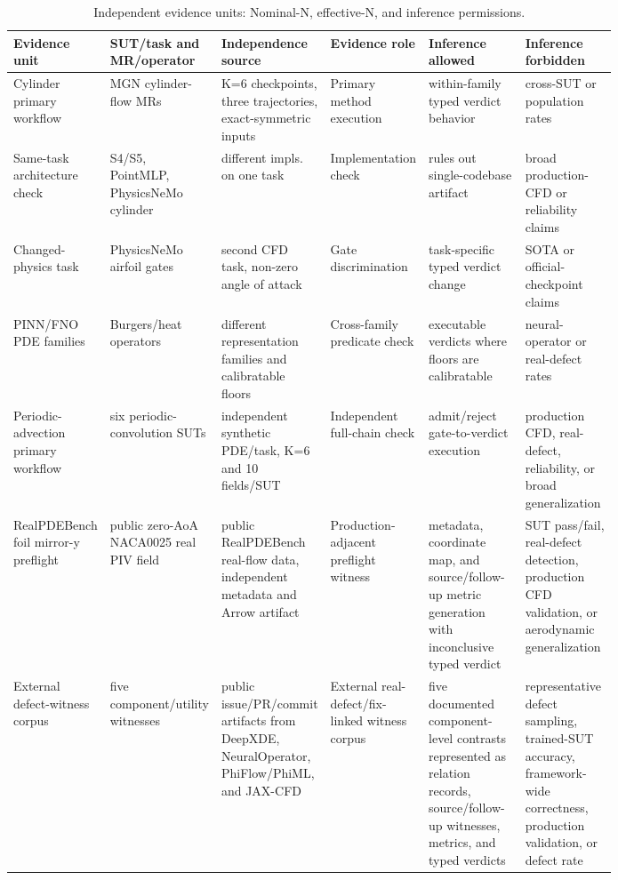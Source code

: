 \documentclass[preprint,12pt]{elsarticle}
\begin{document}
\begin{table}[!htbp]
\centering
\caption{Independent evidence units: Nominal-N, effective-N, and inference permissions.}
\label{tab:effective-n-supp}
\scriptsize
\renewcommand{\arraystretch}{0.9}
\setlength{\tabcolsep}{1.5pt}
\begin{tabularx}{\linewidth}{@{}>{\raggedright\arraybackslash}p{0.14\linewidth}>{\raggedright\arraybackslash}p{0.17\linewidth}>{\raggedright\arraybackslash}p{0.16\linewidth}>{\raggedright\arraybackslash}p{0.16\linewidth}>{\raggedright\arraybackslash}p{0.16\linewidth}Y@{}}
\toprule
\textbf{Evidence unit} & \textbf{SUT/task and MR/operator} & \textbf{Independence source} & \textbf{Evidence role} & \textbf{Inference allowed} & \textbf{Inference forbidden} \\
\midrule
Cylinder primary workflow & MGN cylinder-flow MRs & K=6 checkpoints, three trajectories, exact-symmetric inputs & Primary method execution & within-family typed verdict behavior & cross-SUT or population rates \\
Same-task architecture check & S4/S5, PointMLP, PhysicsNeMo cylinder & different impls. on one task & Implementation check & rules out single-codebase artifact & broad production-CFD or reliability claims \\
Changed-physics task & PhysicsNeMo airfoil gates & second CFD task, non-zero angle of attack & Gate discrimination & task-specific typed verdict change & SOTA or official-checkpoint claims \\
PINN/FNO PDE families & Burgers/heat operators & different representation families and calibratable floors & Cross-family predicate check & executable verdicts where floors are calibratable & neural-operator or real-defect rates \\
Periodic-advection primary workflow & six periodic-convolution SUTs & independent synthetic PDE/task, K=6 and 10 fields/SUT & Independent full-chain check & admit/reject gate-to-verdict execution & production CFD, real-defect, reliability, or broad generalization \\
RealPDEBench foil mirror-y preflight & public zero-AoA NACA0025 real PIV field & public RealPDEBench real-flow data, independent metadata and Arrow artifact & Production-adjacent preflight witness & metadata, coordinate map, and source/follow-up metric generation with inconclusive typed verdict & SUT pass/fail, real-defect detection, production CFD validation, or aerodynamic generalization \\
External defect-witness corpus & five component/utility witnesses & public issue/PR/commit artifacts from DeepXDE, NeuralOperator, PhiFlow/PhiML, and JAX-CFD & External real-defect/fix-linked witness corpus & five documented component-level contrasts represented as relation records, source/follow-up witnesses, metrics, and typed verdicts & representative defect sampling, trained-SUT accuracy, framework-wide correctness, production validation, or defect rate \\

\end{tabularx}
\end{table}
\end{document}
